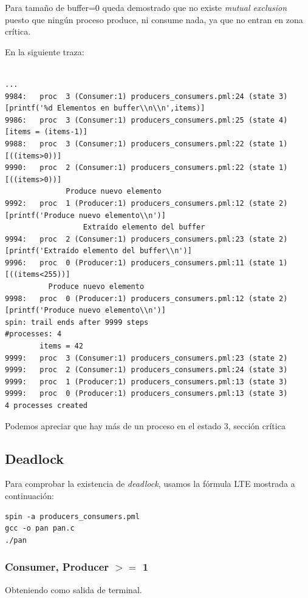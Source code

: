 \documentclass[a4paper,12pt]{article}
\begin{document}
Para tamaño de buffer=0 queda demostrado que no existe \textit{mutual exclusion} puesto que ningún proceso produce, ni consume nada, ya que no entran en zona crítica.

En la siguiente traza:

\begin{verbatim}

...
9984:	proc  3 (Consumer:1) producers_consumers.pml:24 (state 3)	
[printf('%d Elementos en buffer\\n\\n',items)]
9986:	proc  3 (Consumer:1) producers_consumers.pml:25 (state 4)	
[items = (items-1)]
9988:	proc  3 (Consumer:1) producers_consumers.pml:22 (state 1)	
[((items>0))]
9990:	proc  2 (Consumer:1) producers_consumers.pml:22 (state 1)	
[((items>0))]
              Produce nuevo elemento
9992:	proc  1 (Producer:1) producers_consumers.pml:12 (state 2)	
[printf('Produce nuevo elemento\\n')]
                  Extraído elemento del buffer
9994:	proc  2 (Consumer:1) producers_consumers.pml:23 (state 2)	
[printf('Extraído elemento del buffer\\n')]
9996:	proc  0 (Producer:1) producers_consumers.pml:11 (state 1)	
[((items<255))]
          Produce nuevo elemento
9998:	proc  0 (Producer:1) producers_consumers.pml:12 (state 2)	
[printf('Produce nuevo elemento\\n')]
spin: trail ends after 9999 steps
#processes: 4
		items = 42
9999:	proc  3 (Consumer:1) producers_consumers.pml:23 (state 2)
9999:	proc  2 (Consumer:1) producers_consumers.pml:24 (state 3)
9999:	proc  1 (Producer:1) producers_consumers.pml:13 (state 3)
9999:	proc  0 (Producer:1) producers_consumers.pml:13 (state 3)
4 processes created
\end{verbatim}

Podemos apreciar que hay más de un proceso en el estado 3, sección crítica
\subsection{Deadlock}

Para comprobar la existencia de \textit{deadlock}, usamos la  fórmula LTE mostrada a continuación:

\begin{lstlisting}[frame=single]
spin -a producers_consumers.pml
gcc -o pan pan.c 
./pan
\end{lstlisting}

\subsubsection{Consumer, Producer $>=$ 1}
Obteniendo como salida de terminal.
\end{document}
